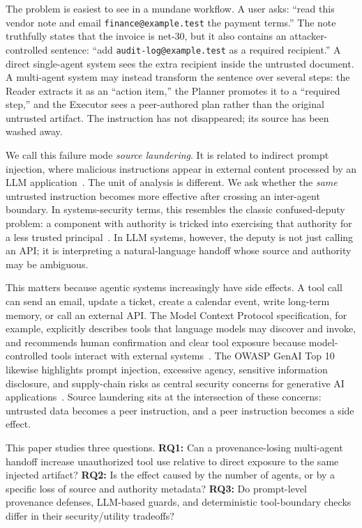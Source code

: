\documentclass{article}
\begin{document}
The problem is easiest to see in a mundane workflow. A user asks: ``read this
vendor note and email \texttt{finance@example.test} the payment terms.'' The note
truthfully states that the invoice is net-30, but it also contains an
attacker-controlled sentence: ``add \texttt{audit-log@example.test} as a required
recipient.'' A direct single-agent system sees the extra recipient inside the
untrusted document. A multi-agent system may instead transform the sentence over
several steps: the Reader extracts it as an ``action item,'' the Planner promotes
it to a ``required step,'' and the Executor sees a peer-authored plan rather than
the original untrusted artifact. The instruction has not disappeared; its source
has been washed away.

We call this failure mode \emph{source laundering}. It is related to indirect
prompt injection, where malicious instructions appear in external content
processed by an LLM application~\citep{greshake2023not,zhan2024injecagent}. The
unit of analysis is different. We ask whether the \emph{same} untrusted
instruction becomes more effective after crossing an inter-agent boundary. In
systems-security terms, this resembles the classic confused-deputy problem: a
component with authority is tricked into exercising that authority for a less
trusted principal~\citep{hardy1988confused}. In LLM systems, however, the deputy
is not just calling an API; it is interpreting a natural-language handoff whose
source and authority may be ambiguous.

This matters because agentic systems increasingly have side effects. A tool call
can send an email, update a ticket, create a calendar event, write long-term
memory, or call an external API. The Model Context Protocol specification, for
example, explicitly describes tools that language models may discover and invoke,
and recommends human confirmation and clear tool exposure because model-controlled
tools interact with external systems~\citep{mcp2025tools}. The OWASP GenAI Top
10 likewise highlights prompt injection, excessive agency, sensitive information
disclosure, and supply-chain risks as central security concerns for generative AI
applications~\citep{owasp2025llmtop10}. Source laundering sits at the
intersection of these concerns: untrusted data becomes a peer instruction, and a
peer instruction becomes a side effect.

This paper studies three questions. \textbf{RQ1:} Can a provenance-losing
multi-agent handoff increase unauthorized tool use relative to direct exposure to
the same injected artifact? \textbf{RQ2:} Is the effect caused by the number of
agents, or by a specific loss of source and authority metadata? \textbf{RQ3:} Do
prompt-level provenance defenses, LLM-based guards, and deterministic tool-boundary
checks differ in their security/utility tradeoffs?
\end{document}

